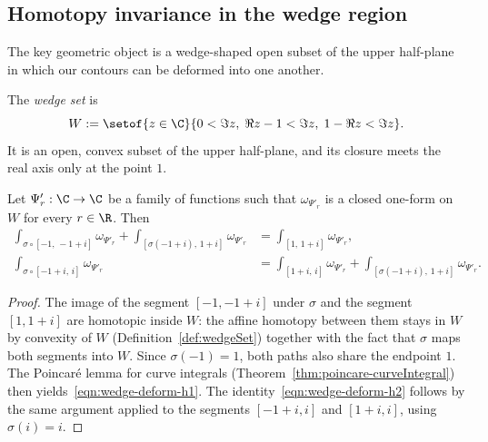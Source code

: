 \subsection{Homotopy invariance in the wedge region}

The key geometric object is a wedge-shaped open subset of the upper half-plane in which our
contours can be deformed into one another.

\begin{definition}\label{def:wedgeSet}\leanok
  The \emph{wedge set} is
  \[
    W := \setof{z \in \C}{0 < \Im z, \; \Re z - 1 < \Im z, \; 1 - \Re z < \Im z}.
  \]
  It is an open, convex subset of the upper half-plane, and its closure meets the real axis only
  at the point $1$.
\end{definition}

\begin{lemma}\label{lemma:wedge-contour-deform}\leanok
  Let $\Psi'_r : \C \to \C$ be a family of functions such that $\omega_{\Psi'_r}$ is a closed
  one-form on $W$ for every $r \in \R$. Then
  \begin{align}
    \int_{\sigma \circ [-1,\, -1+i]} \omega_{\Psi'_r}
      + \int_{[\sigma(-1+i),\, 1+i]} \omega_{\Psi'_r}
      &= \int_{[1,\, 1+i]} \omega_{\Psi'_r},
      \label{eqn:wedge-deform-h1} \\
    \int_{\sigma \circ [-1+i,\, i]} \omega_{\Psi'_r}
      &= \int_{[1+i,\, i]} \omega_{\Psi'_r}
      + \int_{[\sigma(-1+i),\, 1+i]} \omega_{\Psi'_r}.
      \label{eqn:wedge-deform-h2}
  \end{align}
\end{lemma}
\begin{proof}\leanok
  The image of the segment $[-1, -1+i]$ under $\sigma$ and the segment $[1, 1+i]$ are homotopic
  inside $W$: the affine homotopy between them stays in $W$ by convexity of $W$
  (Definition~\ref{def:wedgeSet}) together with the fact that $\sigma$ maps both segments into
  $W$. Since $\sigma(-1) = 1$, both paths also share the endpoint $1$. The Poincar\'e lemma for
  curve integrals (Theorem~\ref{thm:poincare-curveIntegral})
  then yields~\eqref{eqn:wedge-deform-h1}. The identity~\eqref{eqn:wedge-deform-h2} follows by
  the same argument applied to the segments $[-1+i, i]$ and $[1+i, i]$, using $\sigma(i) = i$.
\end{proof}

